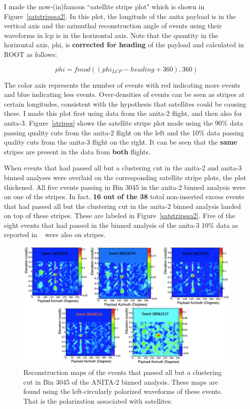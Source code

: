 I made the now-(in)famous ``satellite stripe plot" which is shown in Figure~\ref{satstripesa2}. In this plot, the longitude of the \gls{anita} payload is in the vertical axis and the azimuthal reconstruction angle of events using their waveforms in \gls{lcp} is in the horizontal axis. Note that the  quantity in the horizontal axis, phi, is {\bf corrected for heading} of the payload and calculated in ROOT as follows:

\begin{equation}
phi = fmod((phi_{LCP} - heading + 360),360)
\label{phi}
\end{equation}

The color axis represents the number of events with red indicating more events and blue indicating less events. Over-densities of events can be seen as stripes at certain longitudes, consistent with the hypothesis that satellites could be causing these. I made this plot first using data from the \gls{anita}-2 flight, and then also for \gls{anita}-3. Figure~\ref{stripes} shows the satellite stripe plot made using the 90\% data passing quality cuts from the \gls{anita}-2 flight on the left and the 10\% data passing quality cuts from the \gls{anita}-3 flight on the right. It can be seen that the {\bf same} stripes are present in the data from {\bf both} flights.

When events that had passed all but a clustering cut in the \gls{anita}-2 and \gls{anita}-3 binned analyses were overlaid on the corresponding satellite stripe plots, the plot thickened.
All five events passing in Bin 3045 in the \gls{anita}-2 binned analysis were on one of the stripes. 
In fact, {\bf 16 out of the 38} total non-inserted excess events that had passed all but the clustering cut in the \gls{anita}-2 binned analysis landed on top of these stripes. These are labeled in Figure~\ref{satstripesa2}. Five of the eight events that had passed in the binned analysis of the \gls{anita}-3 10\% data as reported in ~\cite{samStaffordThesis} were also on stripes.

\begin{figure}
\centering
\includegraphics[width=1.0\textwidth]{figures/bin3045EventsCpolMaps.png}
\caption{Reconstruction maps of the events that passed all but a clustering cut in Bin 3045 of the ANITA-2 binned analysis. These maps are found using the left-circularly polarized waveforms of these events. That is the polarization associated with satellites.}
\label{bin3045cpolmaps}
\end{figure}

